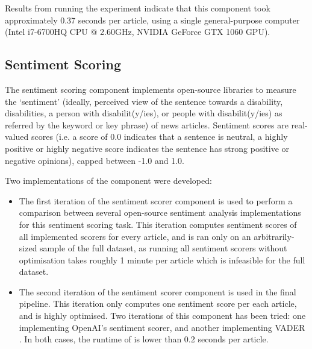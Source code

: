 \documentclass{report}
\newcommand{\textapprox}{\raisebox{0.5ex}{\texttildelow}}  %
\begin{document}
Results from running the experiment indicate that this component took approximately 0.37 seconds per article, using a single general-purpose computer (Intel i7-6700HQ CPU @ 2.60GHz, NVIDIA GeForce GTX 1060 GPU).

\subsection{Sentiment Scoring} \label{des-sentiment}

The sentiment scoring component implements open-source libraries to measure the `sentiment' (ideally, perceived view of the sentence towards a disability, disabilities, a person with disabilit(y/ies), or people with disabilit(y/ies) as referred by the keyword or key phrase) of news articles.
Sentiment scores are real-valued scores (i.e. a score of 0.0 indicates that a sentence is neutral, a highly positive or highly negative score indicates the sentence has strong positive or negative opinions), capped between -1.0 and 1.0.

Two implementations of the component were developed: 
\begin{itemize}
	\item The first iteration of the sentiment scorer component is used to perform a comparison between several open-source sentiment analysis implementations for this sentiment scoring task.
		This iteration computes sentiment scores of all implemented scorers for every article, and is ran only on an arbitrarily-sized sample of the full dataset, as running all sentiment scorers without optimisation takes roughly \textapprox1 minute per article which is infeasible for the full dataset.
	\item The second iteration of the sentiment scorer component is used in the final pipeline.
		This iteration only computes one sentiment score per each article, and is highly optimised.
		Two iterations of this component has been tried: one implementing OpenAI's \cite{OpenAI} sentiment scorer, and another implementing VADER \cite{VADER}.
		In both cases, the runtime of is lower than 0.2 seconds per article.
\end{itemize}
\end{document}
